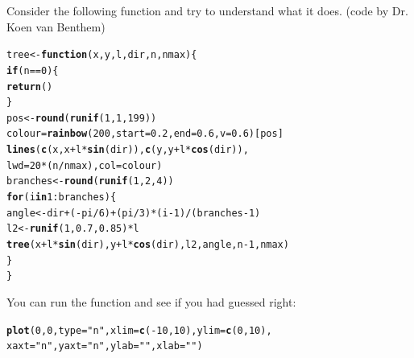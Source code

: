 \documentclass[12pt,a4paper]{scrartcl}\usepackage[]{graphicx}\usepackage[]{color}
\makeatletter
\newcommand{\hlnum}[1]{\textcolor[rgb]{0.686,0.059,0.569}{#1}}%
\newcommand{\hlstr}[1]{\textcolor[rgb]{0.192,0.494,0.8}{#1}}%
\newcommand{\hlopt}[1]{\textcolor[rgb]{0,0,0}{#1}}%
\newcommand{\hlstd}[1]{\textcolor[rgb]{0.345,0.345,0.345}{#1}}%
\newcommand{\hlkwa}[1]{\textcolor[rgb]{0.161,0.373,0.58}{\textbf{#1}}}%
\newcommand{\hlkwb}[1]{\textcolor[rgb]{0.69,0.353,0.396}{#1}}%
\newcommand{\hlkwc}[1]{\textcolor[rgb]{0.333,0.667,0.333}{#1}}%
\newcommand{\hlkwd}[1]{\textcolor[rgb]{0.737,0.353,0.396}{\textbf{#1}}}%
\newenvironment{kframe}{%
 \def\at@end@of@kframe{}%
 \ifinner\ifhmode%
  \def\at@end@of@kframe{\end{minipage}}%
  \begin{minipage}{\columnwidth}%
 \fi\fi%
 \def\FrameCommand##1{\hskip\@totalleftmargin \hskip-\fboxsep
 \colorbox{shadecolor}{##1}\hskip-\fboxsep
     \hskip-\linewidth \hskip-\@totalleftmargin \hskip\columnwidth}%
 \MakeFramed {\advance\hsize-\width
   \@totalleftmargin\z@ \linewidth\hsize
   \@setminipage}}%
 {\par\unskip\endMakeFramed%
 \at@end@of@kframe}
\newenvironment{knitrout}{}{} %
\makeatother
\begin{document}
\begin{Exercise}[difficulty=2, title={What does this function do?}]
Consider the following function and try to understand what it does. (code by Dr. Koen van Benthem)
\begin{knitrout}
\color{fgcolor}\begin{kframe}
\begin{alltt}
\hlstd{tree}\hlkwb{<-}\hlkwa{function}\hlstd{(}\hlkwc{x}\hlstd{,}\hlkwc{y}\hlstd{,}\hlkwc{l}\hlstd{,}\hlkwc{dir}\hlstd{,}\hlkwc{n}\hlstd{,}\hlkwc{nmax}\hlstd{)\{}
\hlkwa{if}\hlstd{(n}\hlopt{==}\hlnum{0}\hlstd{)\{}
\hlkwd{return}\hlstd{()}
\hlstd{\}}
\hlstd{pos}\hlkwb{<-}\hlkwd{round}\hlstd{(}\hlkwd{runif}\hlstd{(}\hlnum{1}\hlstd{,}\hlnum{1}\hlstd{,}\hlnum{199}\hlstd{))}
\hlstd{colour}\hlkwb{=}\hlkwd{rainbow}\hlstd{(}\hlnum{200}\hlstd{,}\hlkwc{start}\hlstd{=}\hlnum{0.2}\hlstd{,}\hlkwc{end}\hlstd{=}\hlnum{0.6}\hlstd{,}\hlkwc{v}\hlstd{=}\hlnum{0.6}\hlstd{)[pos]}
\hlkwd{lines}\hlstd{(}\hlkwd{c}\hlstd{(x,x}\hlopt{+}\hlstd{l}\hlopt{*}\hlkwd{sin}\hlstd{(dir)),}\hlkwd{c}\hlstd{(y,y}\hlopt{+}\hlstd{l}\hlopt{*}\hlkwd{cos}\hlstd{(dir)),}
      \hlkwc{lwd}\hlstd{=}\hlnum{20}\hlopt{*}\hlstd{(n}\hlopt{/}\hlstd{nmax),}\hlkwc{col}\hlstd{=colour)}
\hlstd{branches}\hlkwb{<-}\hlkwd{round}\hlstd{(}\hlkwd{runif}\hlstd{(}\hlnum{1}\hlstd{,}\hlnum{2}\hlstd{,}\hlnum{4}\hlstd{))}
\hlkwa{for}\hlstd{(i} \hlkwa{in} \hlnum{1}\hlopt{:}\hlstd{branches)\{}
\hlstd{angle}\hlkwb{<-}\hlstd{dir}\hlopt{+}\hlstd{(}\hlopt{-}\hlstd{pi}\hlopt{/}\hlnum{6}\hlstd{)}\hlopt{+}\hlstd{(pi}\hlopt{/}\hlnum{3}\hlstd{)}\hlopt{*}\hlstd{(i}\hlopt{-}\hlnum{1}\hlstd{)}\hlopt{/}\hlstd{(branches}\hlopt{-}\hlnum{1}\hlstd{)}
\hlstd{l2}\hlkwb{<-}\hlkwd{runif}\hlstd{(}\hlnum{1}\hlstd{,}\hlnum{0.7}\hlstd{,}\hlnum{0.85}\hlstd{)}\hlopt{*}\hlstd{l}
\hlkwd{tree}\hlstd{(x}\hlopt{+}\hlstd{l}\hlopt{*}\hlkwd{sin}\hlstd{(dir),y}\hlopt{+}\hlstd{l}\hlopt{*}\hlkwd{cos}\hlstd{(dir),l2,angle,n}\hlopt{-}\hlnum{1}\hlstd{,nmax)}
\hlstd{\}}
\hlstd{\}}
\end{alltt}
\end{kframe}
\end{knitrout}

You can run the function and see if you had guessed right:
\begin{knitrout}
\color{fgcolor}\begin{kframe}
\begin{alltt}
\hlkwd{plot}\hlstd{(}\hlnum{0}\hlstd{,}\hlnum{0}\hlstd{,}\hlkwc{type}\hlstd{=}\hlstr{"n"}\hlstd{,}\hlkwc{xlim}\hlstd{=}\hlkwd{c}\hlstd{(}\hlopt{-}\hlnum{10}\hlstd{,}\hlnum{10}\hlstd{),}\hlkwc{ylim}\hlstd{=}\hlkwd{c}\hlstd{(}\hlnum{0}\hlstd{,}\hlnum{10}\hlstd{),}
\hlkwc{xaxt}\hlstd{=}\hlstr{"n"}\hlstd{,}\hlkwc{yaxt}\hlstd{=}\hlstr{"n"}\hlstd{,}\hlkwc{ylab}\hlstd{=}\hlstr{""}\hlstd{,}\hlkwc{xlab}\hlstd{=}\hlstr{""}\hlstd{)}


\end{alltt}
\end{kframe}
\end{knitrout}
\end{Exercise}
\end{document}
